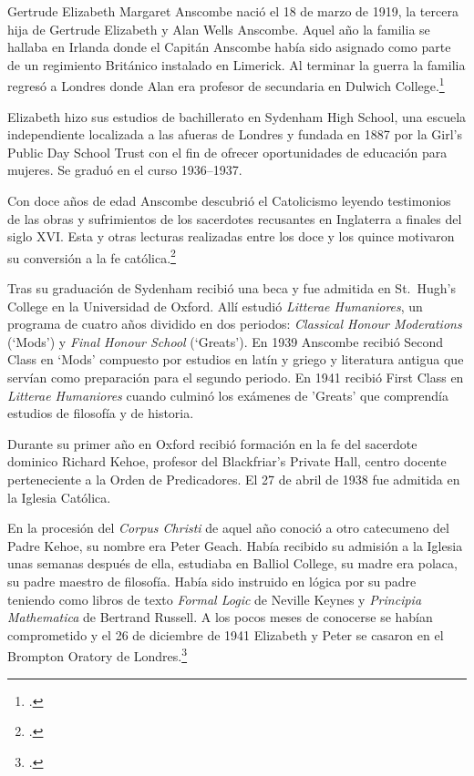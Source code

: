 Gertrude Elizabeth Margaret Anscombe nació el 18 de marzo de 1919, la tercera
  hija de Gertrude Elizabeth y Alan Wells Anscombe. Aquel año la familia se
  hallaba en Irlanda donde el Capitán Anscombe había sido asignado como parte de
  un regimiento Británico instalado en Limerick. Al terminar la guerra la familia
  regresó a Londres donde Alan era profesor de secundaria en Dulwich
  College.\footcite[cf.~][p.~31]{biofellows}

  Elizabeth hizo sus estudios de bachillerato en Sydenham High School, una
  escuela independiente localizada a las afueras de Londres y fundada en 1887 por
  la Girl's Public Day School Trust con el fin de ofrecer oportunidades de
  educación para mujeres. Se graduó en el curso 1936--1937.

  Con doce años de edad Anscombe descubrió el Catolicismo leyendo testimonios de
  las obras y sufrimientos de los sacerdotes recusantes en Inglaterra a finales
  del siglo XVI. Esta y otras lecturas realizadas entre los doce y los quince
  motivaron su conversión a la fe católica.\footcite[cf.~][p.~33]{biofellows}

  Tras su graduación de Sydenham recibió una beca y fue admitida en St.~Hugh's
  College en la Universidad de Oxford. Allí estudió \emph{Litterae Humaniores}, un
  programa de cuatro años dividido en dos periodos: \emph{Classical Honour
    Moderations} (`Mods') y \emph{Final Honour School} (`Greats'). En 1939
  Anscombe recibió Second Class en `Mods' compuesto por estudios en latín y griego
  y literatura antigua que servían como preparación para el segundo periodo. En
  1941 recibió First Class en \emph{Litterae Humaniores} cuando culminó los
  exámenes de 'Greats' que comprendía estudios de filosofía y de historia.

  Durante su primer año en Oxford recibió formación en la fe del sacerdote
  dominico Richard Kehoe, profesor del Blackfriar's Private Hall, centro docente
  perteneciente a la Orden de Predicadores. El 27 de abril de 1938 fue admitida en
  la Iglesia Católica.

  En la procesión del \emph{Corpus Christi} de aquel año conoció a otro
  catecumeno del Padre Kehoe, su nombre era Peter Geach. Había recibido su
  admisión a la Iglesia unas semanas después de ella, estudiaba en Balliol
  College, su madre era polaca, su padre maestro de filosofía. Había sido
  instruido en lógica por su padre teniendo como libros de texto \emph{Formal
    Logic} de Neville Keynes y \emph{Principia Mathematica} de Bertrand Russell.
  A los pocos meses de conocerse se habían comprometido y el 26 de diciembre de
  1941 Elizabeth y Peter se casaron en el Brompton Oratory de
  Londres.\footcite[cf.~][p.~33]{biofellows}

